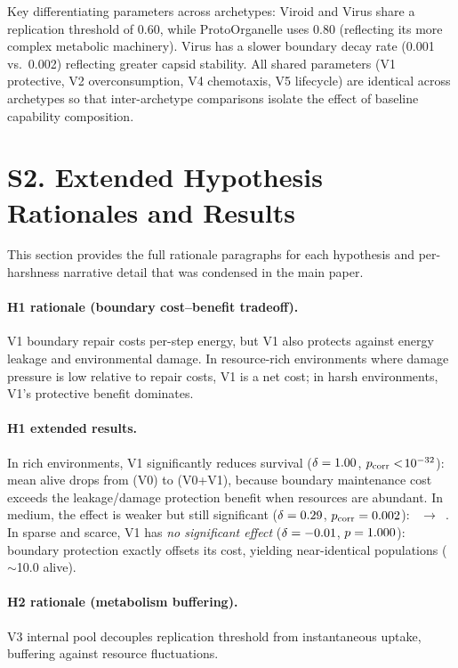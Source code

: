 \documentclass[letterpaper]{article}
\begin{document}
Key differentiating parameters across archetypes: Viroid and Virus share a
replication threshold of 0.60, while ProtoOrganelle uses 0.80 (reflecting
its more complex metabolic machinery).
Virus has a slower boundary decay rate (0.001 vs.\ 0.002) reflecting greater
capsid stability.
All shared parameters (V1 protective, V2 overconsumption, V4 chemotaxis,
V5 lifecycle) are identical across archetypes so that inter-archetype
comparisons isolate the effect of baseline capability composition.

\section*{S2. Extended Hypothesis Rationales and Results}
\label{sec:s2}

This section provides the full rationale paragraphs for each hypothesis
and per-harshness narrative detail that was condensed in the main paper.

\paragraph{H1 rationale (boundary cost--benefit tradeoff).}
V1 boundary repair costs per-step energy, but V1 also protects against
energy leakage and environmental damage.
In resource-rich environments where damage pressure is low relative to
repair costs, V1 is a net cost; in harsh environments, V1's protective
benefit dominates.

\paragraph{H1 extended results.}
In rich environments, V1 significantly reduces survival
($\delta=1.00{}$, $p_\text{corr}<\!10^{-32}{}$):
mean alive drops from \aliveVzeroRich{} (V0) to \aliveVzeroVoneRich{}
(V0+V1), because boundary maintenance cost exceeds the leakage/damage
protection benefit when resources are abundant.
In medium, the effect is weaker but still significant
($\delta=0.29{}$, $p_\text{corr}=0.002{}$):
\aliveVzeroMedium{}~$\to$~\aliveVzeroVoneMedium{}.
In sparse and scarce, V1 has \emph{no significant effect}
($\delta=-0.01{}$, $p=1.000{}$): boundary
protection exactly offsets its cost, yielding near-identical populations
($\sim$10.0 alive).

\paragraph{H2 rationale (metabolism buffering).}
V3 internal pool decouples replication threshold from instantaneous uptake,
buffering against resource fluctuations.
\end{document}
